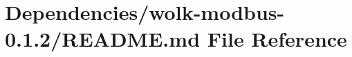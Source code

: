\hypertarget{modbus-dc-motor-slave_2_dependencies_2wolk-modbus-0_81_82_2_r_e_a_d_m_e_8md}{}\section{Dependencies/wolk-\/modbus-\/0.1.2/\+R\+E\+A\+D\+ME.md File Reference}
\label{modbus-dc-motor-slave_2_dependencies_2wolk-modbus-0_81_82_2_r_e_a_d_m_e_8md}
